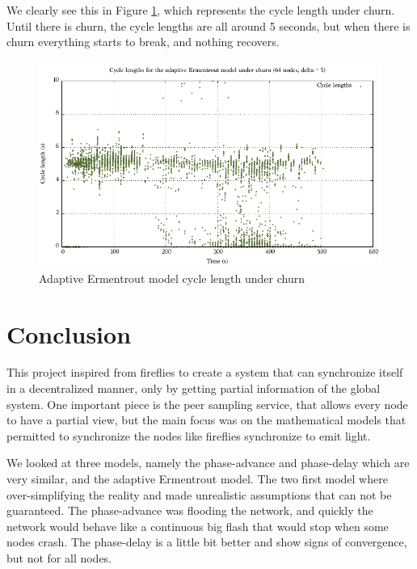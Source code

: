 \documentclass[a4paper, 11pt]{article}
\theoremstyle{plain}
\theoremstyle{definition}
\begin{document}
     We clearly see this in Figure \ref{fig:er-churn-cl}, which represents the cycle length under churn. Until
     there is churn, the cycle lengths are all around 5 seconds, but when there is churn everything starts to
     break, and nothing recovers. 

     \begin{figure}[h]
       \centering
       \includegraphics[width=\textwidth]{../Plots/Firefly-er-64nodes-churn-d5-10-cl.pdf}
       \caption{Adaptive Ermentrout model cycle length under churn}
       \label{fig:er-churn-cl}
     \end{figure}

   
\section{Conclusion}
\label{sec:conclusion}

  
  This project inspired from fireflies to create a system that can synchronize itself in a decentralized
  manner, only by getting partial information of the global system. One important piece is
  the peer sampling service, that allows every node to have a partial view, but the main focus was on the
  mathematical models that permitted to synchronize the nodes like fireflies synchronize to emit light.

  We looked at three models, namely the phase-advance and phase-delay which are very similar, and the
  adaptive Ermentrout model. The two first model where over-simplifying the reality and made unrealistic
  assumptions that can not be guaranteed. The phase-advance was flooding the network, and quickly the network
  would behave like a continuous big flash that would stop when some nodes crash. The phase-delay is a little
  bit better and show signs of convergence, but not for all nodes. 
\end{document}
